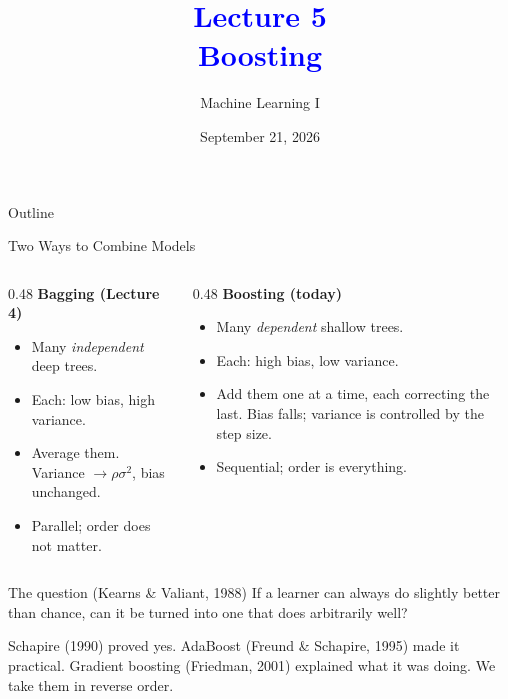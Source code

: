 \documentclass[11pt,aspectratio=169]{beamer}
\title{\textcolor{blue}{Lecture 5 \\ Boosting}}
\subtitle{Machine Learning I}
\date{September 21, 2026}
\begin{document}
\begin{frame}[plain]
\maketitle
\end{frame}

\begin{frame}{Outline}
\tableofcontents
\end{frame}

\begin{frame}{Two Ways to Combine Models}
\begin{columns}[T]
\begin{column}{0.48\textwidth}
\textbf{Bagging (Lecture 4)}
\begin{itemize}
  \item Many \emph{independent} deep trees.
  \item Each: low bias, high variance.
  \item Average them. Variance $\to\rho\sigma^2$, bias unchanged.
  \item Parallel; order does not matter.
\end{itemize}
\end{column}
\begin{column}{0.48\textwidth}
\textbf{Boosting (today)}
\begin{itemize}
  \item Many \emph{dependent} shallow trees.
  \item Each: high bias, low variance.
  \item Add them one at a time, each correcting the last. Bias falls; variance is controlled by the step size.
  \item Sequential; order is everything.
\end{itemize}
\end{column}
\end{columns}
\vspace{10pt}
\begin{block}{The question (Kearns \& Valiant, 1988)}
If a learner can always do slightly better than chance, can it be turned into one that does arbitrarily well?
\end{block}
Schapire (1990) proved yes. AdaBoost (Freund \& Schapire, 1995) made it practical. Gradient boosting
(Friedman, 2001) explained what it was doing. We take them in reverse order.
\end{frame}

\end{document}
